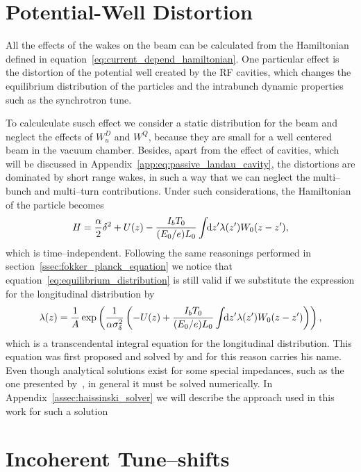 \section{Potential-Well Distortion}

    All the effects of the wakes on the beam can be calculated from the Hamiltonian defined in equation~\eqref{eq:current_depend_hamiltonian}. One particular effect is the distortion of the potential well created by the RF cavities, which changes the equilibrium distribution of the particles and the intrabunch dynamic properties such as the synchrotron tune.

    To calculculate susch effect we consider a static distribution for the beam and neglect the effects of $W^D_u$ and $W^Q$, because they are small for a well centered beam in the vacuum chamber. Besides, apart from the effect of cavities, which will be discussed in Appendix~\ref{app:eq:passive_landau_cavity}, the distortions are dominated by short range wakes, in such a way that we can neglect the multi--bunch and multi--turn contributions. Under such considerations, the Hamiltonian of the particle becomes
    \begin{align}
        H = \frac\alpha2\delta^2 + U(z) -
            \frac{I_bT_0}{(E_0/e)L_0}\int\!\!\text{d}z' \lambda(z') W_0(z-z'),
    \end{align}
    which is time--independent. Following the same reasonings performed in section~\ref{ssec:fokker_planck_equation} we notice that equation~\ref{eq:equilibrium_distribution} is still valid if we substitute the expression for the longitudinal distribution by
    \begin{align}\label{eq:haissinski_equation}
        \lambda(z) = \frac1A\exp\left(\frac{1}{\alpha\sigma_\delta^2}\left(
            -U(z) + \frac{I_bT_0}{(E_0/e)L_0}\int\!\!\text{d}z' \lambda(z') W_0(z-z')\right)\right),
    \end{align}
    which is a transcendental integral equation for the longitudinal distribution. This equation was first proposed and solved by  and for this reason carries his name. Even though analytical solutions exist for some special impedances, such as the one presented by~, in general it must be solved numerically. In Appendix~\ref{assec:haissinski_solver} we will describe the approach used in this work for such a solution

\section{Incoherent Tune--shifts}\label{sec:incoherent_tune_shift}

